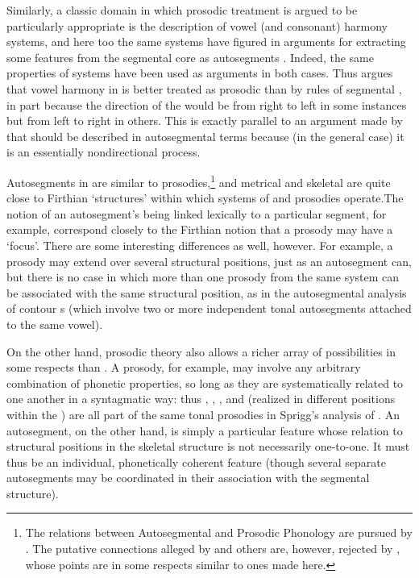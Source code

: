 Similarly, a classic domain in which prosodic treatment is argued to
be particularly appropriate is the description of vowel (and
consonant) harmony systems, and here too the same systems have figured
in arguments for extracting some features from the segmental core as
autosegments \citep{goldsmith79:autosegmental}. Indeed, the same
properties of  systems have been used as arguments in
both cases. Thus \citet{sprigg61:vowel.harmony} argues that vowel
harmony in  is better treated as prosodic than by rules of
segmental , in part because the direction of the
 would be from right to left in some instances but from
left to right in others. This is exactly parallel to an argument made
by \citet{clements76:vowel.harmony} that  should be
described in autosegmental terms because (in the general case) it is
an essentially nondirectional process.

Autosegments in  are similar to prosodies,\footnote{The
  relations between Autosegmental and Prosodic Phonology are pursued
  by \citet{goldsmith92:prosodic}. The putative connections alleged by
  {\Goldsmith} and others are, however, rejected by
  \citet{ogden.local94:misrepresentation}, whose points are in some
  respects similar to ones made here.}  and metrical and skeletal
 are quite close to Firthian `structures' within which
systems of  and prosodies operate.The notion of an
autosegment's being linked lexically to a particular segment, for
example, correspond closely to the Firthian notion that a prosody may
have a `focus'. There are some interesting differences as well,
however. For example, a prosody may extend over several structural
positions, just as an autosegment can, but there is no case in which
more than one prosody from the same system can be associated with the
same structural position, as in the autosegmental analysis of contour
s (which involve two or more independent tonal autosegments
attached to the same vowel).

On the other hand, prosodic theory also allows a richer array of
possibilities in some respects than . A prosody,
for example, may involve any arbitrary combination of phonetic
properties, so long as they are systematically related to one another
in a syntagmatic way: thus , , , and 
(realized in different positions within the ) are all part of
the same tonal prosodies in Sprigg's analysis of . An
autosegment, on the other hand, is simply a particular feature whose
relation to structural positions in the skeletal structure is not
necessarily one-to-one. It must thus be an individual, phonetically
coherent feature (though several separate autosegments may be
coordinated in their association with the segmental structure).


